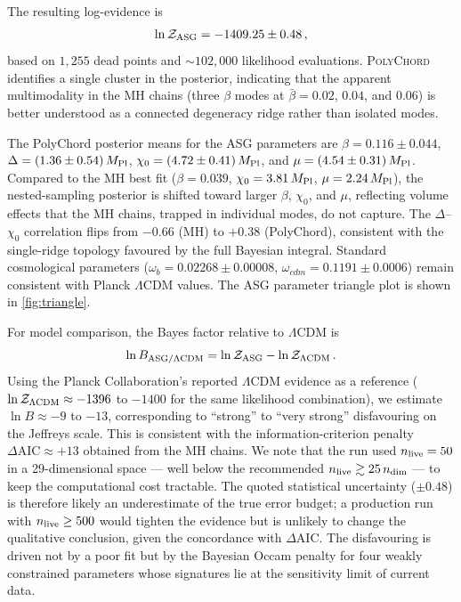 \documentclass[11pt,a4paper]{article}
\begin{document}
The resulting log-evidence is
\begin{equation}
\ln\mathcal{Z}_{\rm ASG}=-1409.25\pm0.48\,,
\label{eq:lnZ}
\end{equation}
based on $1{,}255$ dead points and ${\sim}102{,}000$ likelihood evaluations. \textsc{PolyChord} identifies a single cluster in the posterior, indicating that the apparent multimodality in the MH chains (three $\beta$ modes at $\bar\beta=0.02$, $0.04$, and $0.06$) is better understood as a connected degeneracy ridge rather than isolated modes.

The PolyChord posterior means for the ASG parameters are $\beta=0.116\pm0.044$, $\Delta=(1.36\pm0.54)\,M_{\rm Pl}$, $\chi_0=(4.72\pm0.41)\,M_{\rm Pl}$, and $\mu=(4.54\pm0.31)\,M_{\rm Pl}$. Compared to the MH best fit ($\beta=0.039$, $\chi_0=3.81\,M_{\rm Pl}$, $\mu=2.24\,M_{\rm Pl}$), the nested-sampling posterior is shifted toward larger $\beta$, $\chi_0$, and $\mu$, reflecting volume effects that the MH chains, trapped in individual modes, do not capture. The $\Delta$--$\chi_0$ correlation flips from $-0.66$ (MH) to $+0.38$ (PolyChord), consistent with the single-ridge topology favoured by the full Bayesian integral. Standard cosmological parameters ($\omega_b=0.02268\pm0.00008$, $\omega_{cdm}=0.1191\pm0.0006$) remain consistent with Planck $\Lambda$CDM values. The ASG parameter triangle plot is shown in \cref{fig:triangle}.

For model comparison, the Bayes factor relative to $\Lambda$CDM is
\begin{equation}
\ln B_{\rm ASG/\Lambda CDM}=\ln\mathcal{Z}_{\rm ASG}-\ln\mathcal{Z}_{\Lambda\rm CDM}\,.
\end{equation}
Using the Planck Collaboration's reported $\Lambda$CDM evidence as a reference ($\ln\mathcal{Z}_{\Lambda\rm CDM}\approx-1396$ to $-1400$ for the same likelihood combination), we estimate $\ln B\approx-9$ to $-13$, corresponding to ``strong'' to ``very strong'' disfavouring on the Jeffreys scale. This is consistent with the information-criterion penalty $\Delta\text{AIC}\approx+13$ obtained from the MH chains. We note that the run used $n_{\rm live}=50$ in a 29-dimensional space --- well below the recommended $n_{\rm live}\gtrsim25\,n_{\rm dim}$ --- to keep the computational cost tractable. The quoted statistical uncertainty ($\pm0.48$) is therefore likely an underestimate of the true error budget; a production run with $n_{\rm live}\ge500$ would tighten the evidence but is unlikely to change the qualitative conclusion, given the concordance with $\Delta\text{AIC}$. The disfavouring is driven not by a poor fit but by the Bayesian Occam penalty for four weakly constrained parameters whose signatures lie at the sensitivity limit of current data.
\end{document}
